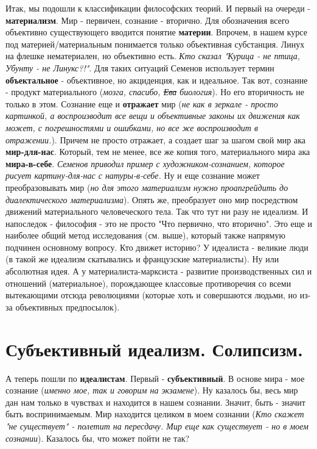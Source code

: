 Итак, мы подошли к классификации философских теорий. И первый на очереди - \textbf{материализм}. Мир - первичен, сознание - вторично. Для обозначения всего объективно существующего вводится понятие \textbf{материи}. Впрочем, в нашем курсе под материей/материальным понимается только объективная субстанция. Линух на флешке нематериален, но объективно есть. \textit{Кто сказал "Курица - не птица, Убунту - не Линукс?!"}. Для таких ситуаций Семенов использует термин \textbf{объектальное} - объективное, но акциденция, как и идеальное. Так вот, сознание - продукт материального (\textit{мозга, спасибо, \sout{Ева} биология}). Но его вторичность не только в этом. Сознание еще и \textbf{отражает} мир (\textit{не как в зеркале - просто картинкой, а воспроизводит все вещи и объективные законы их движения как может, с погрешностями и ошибками, но все же воспроизводит в отражении.}). Причем не просто отражает, а создает шаг за шагом свой мир ака \textbf{мир-для-нас}. Который, тем не менее, все же копия того, материального мира ака \textbf{мира-в-себе}. \textit{Семенов приводил пример с художником-сознанием, которое рисует картину-для-нас с натуры-в-себе.} Ну и еще сознание может преобразовывать мир (\textit{но для этого материализм нужно проапгрейдить до диалектического материализма}). Опять же, преобразует оно мир посредством движений материального человеческого тела. Так что тут ни разу не идеализм. И напоследок - философия - это не просто "Что первично, что вторично". Это еще и наиболее общий метод исследования (см. выше), который также напрямую подчинен основному вопросу. Кто движет историю? У идеалиста - великие люди (в такой же идеализм скатывались и французские материалисты). Ну или абсолютная идея. А у материалиста-марксиста - развитие производственных сил и отношений (материальное), порождающее классовые противоречия со всеми вытекающими отсюда революциями (которые хоть и совершаются людьми, но из-за объективных предпосылок). 

\section{ Субъективный идеализм. Солипсизм.}
А теперь пошли по \textbf{идеалистам}. Первый - \textbf{субъективный}. В основе мира - мое сознание (\textit{именно мое, так и говорим на экзамене}). Ну казалось бы, весь мир дан нам только в чувствах и находится в нашем сознании. Значит, быть - значит быть воспринимаемым. Мир находится целиком в моем сознании (\textit{Кто скажет "не существует" - полетит на пересдачу. Мир еще как существует - но в моем сознании}). Казалось бы, что может пойти не так? 

